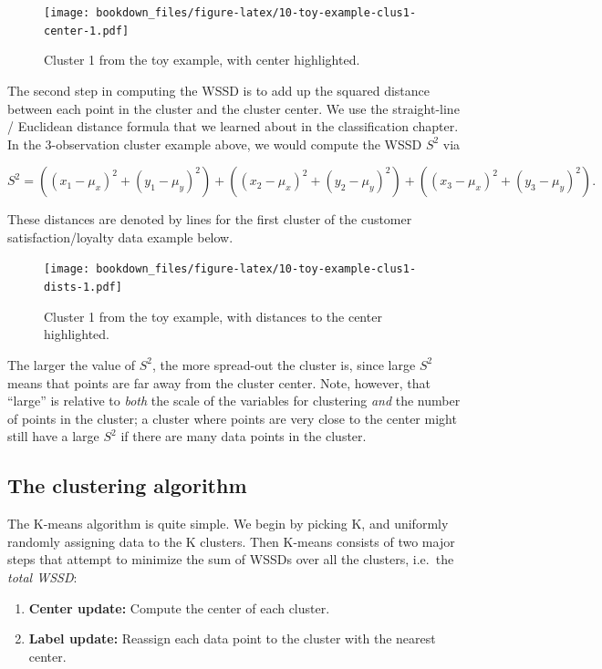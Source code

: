 \documentclass[
]{krantz}
\providecommand{\tightlist}{%
  \setlength{\itemsep}{0pt}\setlength{\parskip}{0pt}}
\begin{document}
\begin{figure}
\centering
\texttt{[image: bookdown\_files/figure-latex/10-toy-example-clus1-center-1.pdf]}
\caption{\label{fig:10-toy-example-clus1-center}Cluster 1 from the toy example, with center highlighted.}
\end{figure}

The second step in computing the WSSD is to add up the squared distance between each point in the cluster and the cluster center.
We use the straight-line / Euclidean distance formula that we learned about in the classification chapter.
In the 3-observation cluster example above, we would compute the WSSD \(S^2\) via

\[S^2 = \left((x_1 - \mu_x)^2 + (y_1 - \mu_y)^2\right) + \left((x_2 - \mu_x)^2 + (y_2 - \mu_y)^2\right) +\left((x_3 - \mu_x)^2 + (y_3 - \mu_y)^2\right).\]

These distances are denoted by lines for the first cluster of the customer satisfaction/loyalty data example below.

\begin{figure}
\centering
\texttt{[image: bookdown\_files/figure-latex/10-toy-example-clus1-dists-1.pdf]}
\caption{\label{fig:10-toy-example-clus1-dists}Cluster 1 from the toy example, with distances to the center highlighted.}
\end{figure}

The larger the value of \(S^2\), the more spread-out the cluster is, since large \(S^2\) means that points are far away from the cluster center.
Note, however, that ``large'' is relative to \emph{both} the scale of the variables for clustering \emph{and} the number of points in the cluster; a
cluster where points are very close to the center might still have a large \(S^2\) if there are many data points in the cluster.

\hypertarget{the-clustering-algorithm}{%
\subsection{The clustering algorithm}\label{the-clustering-algorithm}}

The K-means algorithm is quite simple. We begin by picking K, and uniformly randomly assigning data to the K clusters.
Then K-means consists of two major steps that attempt to minimize the
sum of WSSDs over all the clusters, i.e.~the \emph{total WSSD}:

\begin{enumerate}
\def\labelenumi{\arabic{enumi}.}
\tightlist
\item
  \textbf{Center update:} Compute the center of each cluster.
\item
  \textbf{Label update:} Reassign each data point to the cluster with the nearest center.
\end{enumerate}
\end{document}
